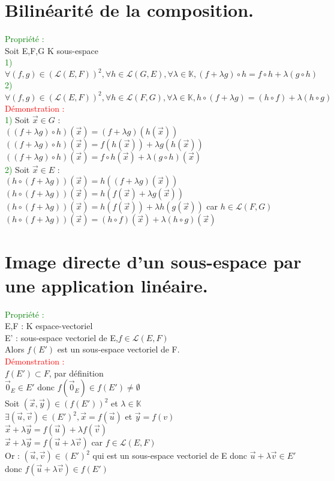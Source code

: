 \documentclass{article}
\begin{document}
 \section{Bilinéarité de la composition.}
\textcolor{green}{Propriété :} \\ 
Soit E,F,G K sous-espace \\ 
\textcolor{green}{1)}$\forall (f,g) \in (\mathcal{L}(E,F))^2,\forall h \in \mathcal{L}(G,E), \forall \lambda \in \mathbb{K}, (f +\lambda g)\circ h= f\circ h + \lambda(g\circ h)$ \\ 
\textcolor{green}{2)}$\forall (f,g) \in (\mathcal{L}(E,F))^2,\forall h \in \mathcal{L}(F,G), \forall \lambda \in \mathbb{K}, h \circ (f +\lambda g)= (h \circ f) + \lambda(h\circ g)$ \\ 
\textcolor{red}{Démonstration :} \\ 
\textcolor{green}{1)} Soit $\vec{x} \in G$ : \\ 
$((f +\lambda g)\circ h)(\vec{x})= (f + \lambda g)(h(\vec{x}))$ \\
$((f +\lambda g)\circ h)(\vec{x})=f(h(\vec{x}))+ \lambda g(h(\vec{x}))$ \\ 
$((f +\lambda g)\circ h)(\vec{x})=f \circ h (\vec{x})+ \lambda (g \circ h)(\vec{x})$ \\ 
\textcolor{green}{2)} Soit $\vec{x} \in E$ : \\ 
$(h \circ (f +\lambda g))(\vec{x})=h  ((f +\lambda g)(\vec{x}))$ \\ 
$(h \circ (f +\lambda g))(\vec{x})= h(f(\vec{x})+ \lambda g(\vec{x}))$ \\ 
$(h \circ (f +\lambda g))(\vec{x})=h(f(\vec{x}))+ \lambda h(g(\vec{x}))$ car $h \in \mathcal{L}(F,G)$ \\ 
$(h \circ (f +\lambda g))(\vec{x})= (h \circ f)(\vec{x})+ \lambda(h\circ g)(\vec{x})$
\section{Image directe d'un sous-espace par une application linéaire.}
\textcolor{green}{Propriété :} \\ 
E,F : K espace-vectoriel \\ 
E' : sous-espace vectoriel de E,$f \in \mathcal{L}(E,F)$ \\ 
Alors $f(E')$ est un sous-espace vectoriel de F. \\ 
\textcolor{red}{Démonstration :} \\ 
$f(E') \subset F$, par définition \\ 
$\vec{0}_E \in E'$ donc $f(\vec{0}_E) \in f(E') \neq \emptyset$ \\ 
Soit $(\vec{x},\vec{y}) \in (f(E'))^2$ et $ \lambda \in \mathbb{K}$ \\ 
$\exists (\vec{u}, \vec{v}) \in (E')^2, \vec{x}=f(\vec{u})$ et $\vec{y}=f(v)$ \\ 
$\vec{x}+\lambda \vec{y}=f(\vec{u})+ \lambda f(\vec{v})$ \\ 
$\vec{x}+\lambda \vec{y}=f(\vec{u}+ \lambda \vec{v})$ car $f \in \mathcal{L}(E,F)$ \\ 
Or : $(\vec{u}, \vec{v}) \in (E')^2$ qui est un sous-espace vectoriel de E donc $\vec{u}+ \lambda \vec{v} \in E'$ donc $f(\vec{u}+ \lambda \vec{v})\in f(E')$
\end{document}
